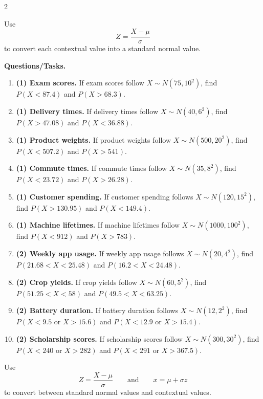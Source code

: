 \begin{multicols}{2}
\vspace{0.25cm}
\vspace{-0.25cm}

Use
\[
Z=\frac{X-\mu}{\sigma}
\]
to convert each contextual value into a standard normal value.

\textbf{Questions/Tasks.}
\begin{enumerate}[label=\textbf{\arabic*)}]
    \item \textbf{(1) Exam scores.} If exam scores follow \(X\sim N(75,10^2)\), find \(P(X<87.4)\) and \(P(X>68.3)\).
    \item \textbf{(1) Delivery times.} If delivery times follow \(X\sim N(40,6^2)\), find \(P(X>47.08)\) and \(P(X<36.88)\).
    \item \textbf{(1) Product weights.} If product weights follow \(X\sim N(500,20^2)\), find \(P(X<507.2)\) and \(P(X>541)\).
    \item \textbf{(1) Commute times.} If commute times follow \(X\sim N(35,8^2)\), find \(P(X<23.72)\) and \(P(X>26.28)\).
    \item \textbf{(1) Customer spending.} If customer spending follows \(X\sim N(120,15^2)\), find \(P(X>130.95)\) and \(P(X<149.4)\).
    \item \textbf{(1) Machine lifetimes.} If machine lifetimes follow \(X\sim N(1000,100^2)\), find \(P(X<912)\) and \(P(X>783)\).
    \item \textbf{(2) Weekly app usage.} If weekly app usage follows \(X\sim N(20,4^2)\), find \(P(21.68<X<25.48)\) and \(P(16.2<X<24.48)\).
    \item \textbf{(2) Crop yields.} If crop yields follow \(X\sim N(60,5^2)\), find \(P(51.25<X<58)\) and \(P(49.5<X<63.25)\).
    \item \textbf{(2) Battery duration.} If battery duration follows \(X\sim N(12,2^2)\), find \(P(X<9.5\text{ or }X>15.6)\) and \(P(X<12.9\text{ or }X>15.4)\).
    \item \textbf{(2) Scholarship scores.} If scholarship scores follow \(X\sim N(300,30^2)\), find \(P(X<240\text{ or }X>282)\) and \(P(X<291\text{ or }X>367.5)\).
\end{enumerate}

\vspace{0.25cm}
\vspace{-0.25cm}

Use
\[
Z=\frac{X-\mu}{\sigma}
\qquad \text{and} \qquad
x=\mu+\sigma z
\]
to convert between standard normal values and contextual values.


\end{multicols}
